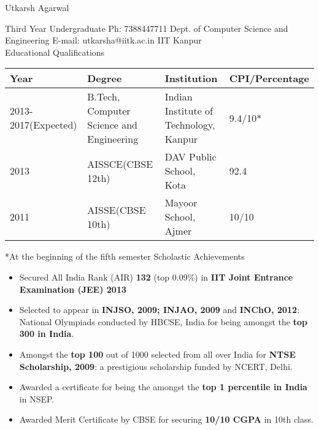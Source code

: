 \documentclass{article}
\begin{document}
\sffamily
\begin{flushleft}
{\Huge{Utkarsh Agarwal}}
\end{flushleft}
\vspace{0.5cm}
{\small Third Year Undergraduate \hspace{11.5cm} Ph: 7388447711\newline
       Dept. of Computer Science and Engineering \hspace{9.05cm} E-mail: utkarsha@iitk.ac.in\newline
       IIT Kanpur\newline
}
\\
\hspace{-2cm}
{\Large Educational Qualifications}
\newline
\newline
\begin{tabular}{| l | l | l |l|}
\hline
Year         & Degree & Institution & CPI/Percentage\\ \hline
2013-2017(Expected) & B.Tech, Computer Science and Engineering & Indian Institute of Technology, Kanpur & 9.4/10*\\ \hline
2013 & AISSCE(CBSE 12th) & DAV Public School, Kota & 92.4 \\ \hline
2011 & AISSE(CBSE 10th) & Mayoor School, Ajmer & 10/10\\ \hline
\end{tabular}
*At the beginning of the fifth semester \newline\newline\newline
{\Large Scholastic Achievements}
	\begin{itemize}
\item Secured All India Rank (AIR) \textbf {132} (top 0.09\%) in \textbf {IIT Joint Entrance Examination (JEE) 2013} 
\item Selected to appear in \textbf{INJSO, 2009; INJAO, 2009} and \textbf{INChO, 2012}: National Olympiads conducted by HBCSE, India for being amongst the \textbf{top 300 in India}.
\item Amongst the \textbf{top 100} out of 1000 selected from all over India for \textbf{NTSE Scholarship, 2009}: a prestigious scholarship funded by NCERT, Delhi.
\item Awarded a certificate for being the amongst the \textbf{top 1 percentile in India} in  NSEP.
\item Awarded Merit Certificate by CBSE for securing \textbf{10/10 CGPA} in 10th class.
	\end{itemize}
\end{document}
